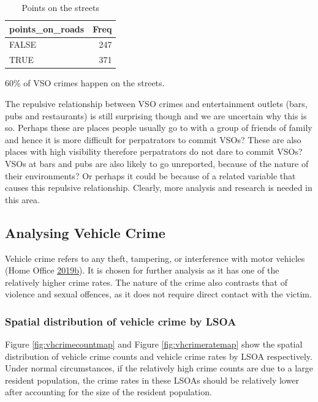 \documentclass[]{article}
\theoremstyle{definition}
\theoremstyle{definition}
\theoremstyle{definition}
\theoremstyle{remark}
\begin{document}
\begin{table}

\caption{\label{tab:unnamed-chunk-15}Points on the streets}
\centering
\begin{tabular}[t]{l|r}
\hline
points\_on\_roads & Freq\\
\hline
FALSE & 247\\
\hline
TRUE & 371\\
\hline
\end{tabular}
\end{table}

60\% of VSO crimes happen on the streets.

The repulsive relationship between VSO crimes and entertainment outlets
(bars, pubs and restaurants) is still surprising though and we are
uncertain why this is so. Perhaps these are places people usually go to
with a group of friends of family and hence it is more difficult for
perpatrators to commit VSOs? These are also places with high visibility
therefore perpatrators do not dare to commit VSOs? VSOs at bars and pubs
are also likely to go unreported, because of the nature of their
environments? Or perhaps it could be because of a related variable that
causes this repulsive relationship. Clearly, more analysis and research
is needed in this area.

\hypertarget{htmlwidget-7df271cd227c427194ae}{}

\subsection{Analysing Vehicle Crime}\label{analysing-vehicle-crime}

Vehicle crime refers to any theft, tampering, or interference with motor
vehicles (Home Office
\protect\hyperlink{ref-HomeOffice2019}{2019}\protect\hyperlink{ref-HomeOffice2019}{b}).
It is chosen for further analysis as it has one of the relatively higher
crime rates. The nature of the crime also contrasts that of violence and
sexual offences, as it does not require direct contact with the victim.

\subsubsection{Spatial distribution of vehicle crime by
LSOA}\label{spatial-distribution-of-vehicle-crime-by-lsoa}

Figure \ref{fig:vhcrimecountmap} and Figure \ref{fig:vhcrimeratemap}
show the spatial distribution of vehicle crime counts and vehicle crime
rates by LSOA respectively. Under normal circumstances, if the
relatively high crime counts are due to a large resident population, the
crime rates in these LSOAs should be relatively lower after accounting
for the size of the resident population.
\end{document}
